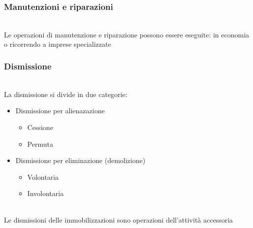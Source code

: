 \documentclass{report}
\begin{document}
\subsubsection{Manutenzioni e riparazioni} %
\label{sec:Manutenzioni e riparazioni}

\\
Le operazioni di manutenzione e riparazione possono essere eseguite: in economia o ricorrendo a imprese specializzate
\subsubsection{Dismissione} %
\label{sec:Dismissione}
\\
La dismissione si divide in due categorie:
\\
\begin{itemize}
  \item{Dismissione per alienazazione
\begin{itemize}
  \item{Cessione}
  \item{Permuta}
\end{itemize}
    }
  \item{Dismissione per eliminazione (demolizione)
\begin{itemize}
  \item{Volontaria}
  \item{Involontaria}
\end{itemize}
    }
\end{itemize}
\\
Le dismissioni delle immobilizzazioni sono operazioni dell'attività accessoria

\end{document}
